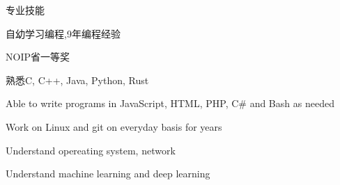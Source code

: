 \documentclass[UTF8]{resume} %
\begin{document}
\begin{rSection}{专业技能}
    \begin{rSubsection}{}{}{}{}
        \item 自幼学习编程,9年编程经验
        \item NOIP省一等奖
        \item 熟悉C, C++, Java, Python, Rust
        \item Able to write programs in JavaScript, HTML, PHP, C\# and Bash as needed
        \item Work on Linux and git  on everyday basis for years
        \item Understand opereating system, network
        \item Understand machine learning and deep learning
    \end{rSubsection}
\end{rSection}
\end{document}
